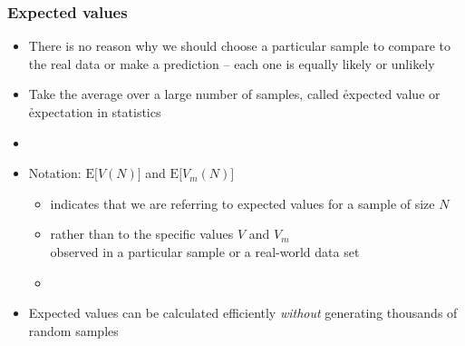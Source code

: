 \documentclass[handout,notes=show,t]{beamer} %
\begin{document}
\begin{frame}
  \frametitle{Expected values}

  \begin{itemize}
  \item There is no reason why we should choose a particular sample to compare
    to the real data or make a prediction -- each one is equally likely or
    unlikely
  \item Take the average over a large number of samples, called \h{expected
      value} or \h{expectation} in statistics
  \item[]
  \item Notation: $\text{E}\bigl[V(N)\bigr]$ and $\text{E}\bigl[V_m(N)\bigr]$
    \begin{itemize}
    \item indicates that we are referring to expected values for a sample of
      size $N$
    \item rather than to the specific values $V$ and $V_m$\\
      observed in a particular sample or a real-world data set
    \item[]
    \end{itemize}
  \item Expected values can be calculated efficiently \emph{without}
    generating thousands of random samples
  \end{itemize}
\end{frame}
\end{document}

